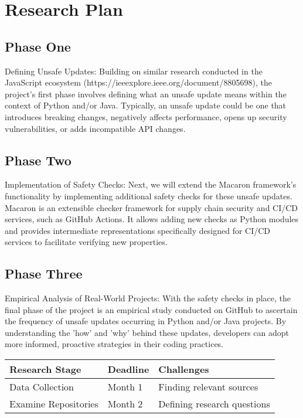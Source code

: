 \section{Research Plan}


\subsection{Phase One}
Defining Unsafe Updates: Building on similar research conducted in the JavaScript 
ecosystem (https://ieeexplore.ieee.org/document/8805698), the project's first phase 
involves defining what an unsafe update means within the context of Python and/or Java. 
Typically, an unsafe update could be one that introduces breaking changes, 
negatively affects performance, opens up security vulnerabilities, 
or adds incompatible API changes.
\subsection{Phase Two}
Implementation of Safety Checks: Next, we will extend the Macaron framework's 
functionality by implementing additional safety checks for these unsafe updates.
Macaron is an extensible checker framework for supply chain security and CI/CD services,
such as GitHub Actions. It allows adding new checks as Python modules and provides 
intermediate representations specifically designed for CI/CD services to facilitate 
verifying new properties.
\subsection{Phase Three}
Empirical Analysis of Real-World Projects: With the safety checks in place, 
the final phase of the project is an empirical study conducted on GitHub to ascertain
the frequency of unsafe updates occurring in Python and/or Java projects.
By understanding the 'how' and 'why' behind these updates, developers can adopt more 
informed, proactive strategies in their coding practices.
\begin{table}[h]
  \centering
  \begin{adjustbox}{max width=\columnwidth}
  \begin{tabular}{|p{3.2cm}|p{2.6cm}|p{2.6cm}|}
      \hline
      \textbf{Research Stage} & \textbf{Deadline} & \textbf{Challenges} \\
      \hline
      Data Collection & Month 1 & Finding relevant sources \\
      \hline
      Examine Repositories & Month 2 & Defining research questions \\
      \hline

  \end{tabular}
  \end{adjustbox}
\end{table}
